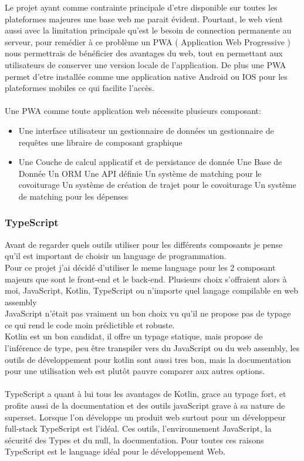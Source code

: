 
Le projet ayant comme contrainte principale d'etre disponible sur toutes les plateformes majeures une base web me parait évident.
Pourtant, le web vient aussi avec la limitation principale qu'est le besoin de connection permanente au serveur,
pour remédier à ce problème un PWA ( Application Web Progressive ) nous permettrais de bénéficier des avantages du web,
tout en permettant aux utilisateurs de conserver une version locale de l'application.
De plus une PWA permet d'etre installée comme une application native Android ou IOS pour les plateformes mobiles ce qui facilite l'accès.\\\\

Une PWA comme toute application web nécessite plusieurs composant:
\begin{itemize}
    \item Une interface utilisateur
    \subitem un gestionnaire de données
    \subitem un gestionnaire de requêtes
    \subitem une libraire de composant graphique
    \item Une Couche de calcul applicatif et de persistance de donnée
    \subitem Une Base de Donnée
    \subitem Un ORM
    \subitem Une API définie
    \subitem Un système de matching pour le covoiturage
    \subitem Un système de création de trajet pour le covoiturage
    \subitem Un système de matching pour les dépenses
\end{itemize}
\subsubsection{TypeScript}
Avant de regarder quels outils utiliser pour les différents composants je pense qu'il est important de choisir un language de programmation.\\
Pour ce projet j'ai décidé d'utiliser le meme language pour les 2 composant majeurs que sont le front-end et le back-end.
Plusieurs choix s'offraient alors à moi, JavaScript, Kotlin, TypeScript ou n'importe quel langage compilable en web assembly\\
JavaScript n'était pas vraiment un bon choix vu qu'il ne propose pas de typage ce qui rend le code moin prédictible et robuste.\\
Kotlin est un bon candidat, il offre un typage statique, mais propose de l'inférence de type, peu être transpiler vers du JavaScript ou du web assembly,
les outils de développement pour kotlin sont aussi tres bon, mais la documentation pour une utilisation web est plutôt pauvre comparer aux autres options.\\\\
TypeScript a quant à lui tous les avantages de Kotlin, grace au typage fort, et profite aussi de la documentation et des outils javaScript grave à sa nature de superset.
Lorsque l'on développe un produit web surtout pour un développeur full-stack TypeScript est l'idéal.
Ces outils, l'environnement JavaScript, la sécurité des Types et du null, la documentation.
Pour toutes ces raisons TypeScript est le language idéal pour le développement Web.

